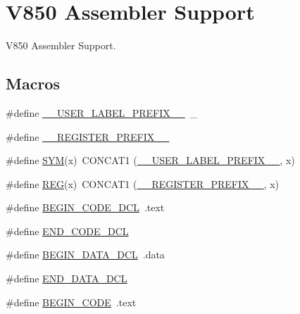 \hypertarget{group__RTEMSScoreCPUV850ASM}{}\section{V850 Assembler Support}
\label{group__RTEMSScoreCPUV850ASM}


V850 Assembler Support.  


\subsection*{Macros}
\begin{DoxyCompactItemize}
\item 
\#define \mbox{\hyperlink{group__RTEMSScoreCPUV850ASM_gaff6bf0ff0fa3b5cbd23a8ae1131c87a9}{\+\_\+\+\_\+\+U\+S\+E\+R\+\_\+\+L\+A\+B\+E\+L\+\_\+\+P\+R\+E\+F\+I\+X\+\_\+\+\_\+}}~\+\_\+
\item 
\#define \mbox{\hyperlink{group__RTEMSScoreCPUV850ASM_ga08d4062230ffc8494f4be4f6447497e4}{\+\_\+\+\_\+\+R\+E\+G\+I\+S\+T\+E\+R\+\_\+\+P\+R\+E\+F\+I\+X\+\_\+\+\_\+}}
\item 
\#define \mbox{\hyperlink{group__RTEMSScoreCPUV850ASM_gafe05d428a5f345f51fb591debb815325}{S\+YM}}(x)~C\+O\+N\+C\+A\+T1 (\mbox{\hyperlink{group__RTEMSScoreCPUx86-64ASM_gaff6bf0ff0fa3b5cbd23a8ae1131c87a9}{\+\_\+\+\_\+\+U\+S\+E\+R\+\_\+\+L\+A\+B\+E\+L\+\_\+\+P\+R\+E\+F\+I\+X\+\_\+\+\_\+}}, x)
\item 
\#define \mbox{\hyperlink{group__RTEMSScoreCPUV850ASM_gacee196421e9a06f7700bb3064b13b37a}{R\+EG}}(x)~C\+O\+N\+C\+A\+T1 (\mbox{\hyperlink{group__RTEMSScoreCPUV850ASM_ga08d4062230ffc8494f4be4f6447497e4}{\+\_\+\+\_\+\+R\+E\+G\+I\+S\+T\+E\+R\+\_\+\+P\+R\+E\+F\+I\+X\+\_\+\+\_\+}}, x)
\item 
\#define \mbox{\hyperlink{group__RTEMSScoreCPUV850ASM_ga63dd305e6cb437ad2dc29a4184f96fbc}{B\+E\+G\+I\+N\+\_\+\+C\+O\+D\+E\+\_\+\+D\+CL}}~.text
\item 
\#define \mbox{\hyperlink{group__RTEMSScoreCPUV850ASM_gad7bee6a7cae4ed99b9f83f54afaecec8}{E\+N\+D\+\_\+\+C\+O\+D\+E\+\_\+\+D\+CL}}
\item 
\#define \mbox{\hyperlink{group__RTEMSScoreCPUV850ASM_ga7f059077f76d2de57e245990dc6fdf25}{B\+E\+G\+I\+N\+\_\+\+D\+A\+T\+A\+\_\+\+D\+CL}}~.data
\item 
\#define \mbox{\hyperlink{group__RTEMSScoreCPUV850ASM_gaba5951c6a7df52e7c13d07a6823e9758}{E\+N\+D\+\_\+\+D\+A\+T\+A\+\_\+\+D\+CL}}
\item 
\#define \mbox{\hyperlink{group__RTEMSScoreCPUV850ASM_ga6d6dc213aff5b736968e2aff37eb2c99}{B\+E\+G\+I\+N\+\_\+\+C\+O\+DE}}~.text

\end{DoxyCompactItemize}
